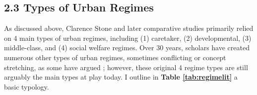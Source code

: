 \documentclass[preprint, 3p,
authoryear]{elsarticle} %
\begin{document}
\hypertarget{types-of-urban-regimes}{%
\subsection{2.3 Types of Urban Regimes}\label{types-of-urban-regimes}}

As discussed above, Clarence Stone \citeyearpar{stone_1993} and later
comparative studies \citep{kilburn_2004, de_socio_2007} primarily relied
on 4 main types of urban regimes, including (1) caretaker, (2)
developmental, (3) middle-class, and (4) social welfare regimes. Over 30
years, scholars have created numerous other types of urban regimes,
sometimes conflicting or concept stretching, as some have argued
\citep{mossberger_and_stoker_2001}; however, these original 4 regime
types are still arguably the main types at play today. I outline in
\textbf{Table \ref{tab:regimelit}} a basic typology.
\end{document}
